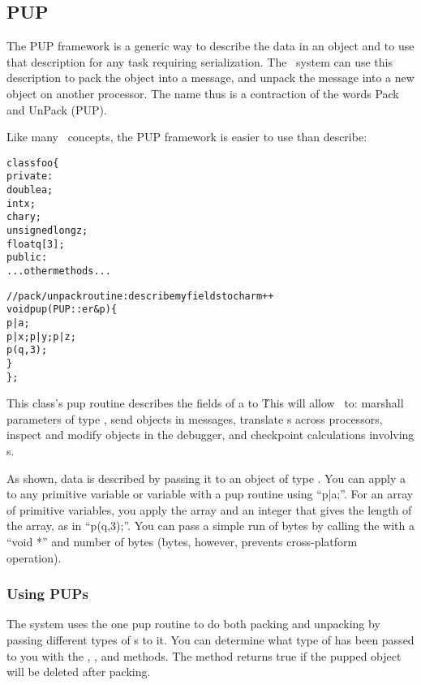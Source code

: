 \subsection{PUP}
\label{sec:pup}

The  PUP framework is a generic way to describe the data in an object and to use that description for any task requiring serialization.
The \charmpp\ system can use this description to pack the object 
into a message, and unpack the message into a new object on another 
processor. 
The name thus is a contraction of the words Pack and UnPack (PUP). 

Like many \CC\ concepts, the PUP framework is easier to use than 
describe: 

\begin{alltt}
class foo \{
 private:
    double a;
    int x;
    char y;
    unsigned long z;
    float q[3];
 public:
    ...other methods...

    //pack/unpack routine: describe my fields to charm++
    void pup(PUP::er &p) \{
      p|a;
      p|x; p|y; p|z;
      p(q,3);
    \}
\};
\end{alltt}

This class's pup routine describes the fields of a  to \charmpp\.
This will allow \charmpp\ to: marshall parameters of type ,
send  objects in messages, translate s across processors,
inspect and modify  objects in the debugger, and checkpoint 
calculations involving s.

As shown, data is described by passing it to an object of type 
 .  You can apply a  to any 
primitive variable or variable with a pup routine using ``p|a;''.
For an array of primitive variables, you apply the array and an integer
that gives the length of the array, as in ``p(q,3);''.  You can pass a 
simple run of bytes 
by calling the  with a ``void *'' and number of bytes
(bytes, however, prevents cross-platform operation).


\subsubsection{Using PUPs}
\label{sec:pupmodes}

The system uses the one pup routine to do both packing and unpacking by
passing different types of s to it.  You can determine
what type of  has been passed to you with the
, , and  methods.
The  method returns true if the pupped object
will be deleted after packing.

